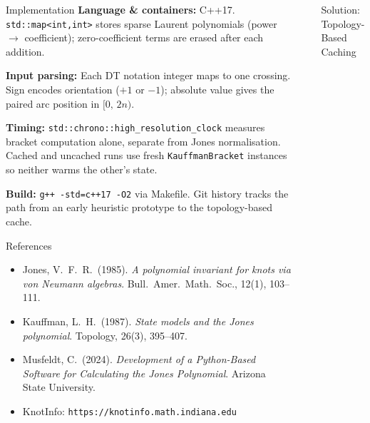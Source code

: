 \documentclass[final]{beamer}
\newlength{\sepwidth}
\newlength{\colwidth}
\newcommand{\separatorcolumn}{\begin{column}{\sepwidth}\end{column}}
\begin{document}
\begin{frame}[t,fragile]
\begin{columns}[t]
\begin{column}{\colwidth}
  \begin{block}{Implementation}
    \textbf{Language \& containers:} C++17. \texttt{std::map<int,int>} stores sparse Laurent polynomials (power $\to$ coefficient); zero-coefficient terms are erased after each addition.

    \vspace{0.1cm}
    \textbf{Input parsing:} Each DT notation integer maps to one crossing. Sign encodes orientation ($+1$ or $-1$); absolute value gives the paired arc position in $[0,\,2n)$.

    \vspace{0.1cm}
    \textbf{Timing:} \texttt{std::chrono::high\_resolution\_clock} measures bracket computation alone, separate from Jones normalisation. Cached and uncached runs use fresh \texttt{KauffmanBracket} instances so neither warms the other's state.

    \vspace{0.1cm}
    \textbf{Build:} \texttt{g++ -std=c++17 -O2} via Makefile. Git history tracks the path from an early heuristic prototype to the topology-based cache.
  \end{block}

  \begin{block}{References}
    \footnotesize
    \begin{itemize}\setlength\itemsep{0pt}
      \item Jones, V.\ F.\ R.\ (1985). \textit{A polynomial invariant for knots via von Neumann algebras}. Bull.\ Amer.\ Math.\ Soc., 12(1), 103--111.
      \item Kauffman, L.\ H.\ (1987). \textit{State models and the Jones polynomial}. Topology, 26(3), 395--407.
      \item Musfeldt, C.\ (2024). \textit{Development of a Python-Based Software for Calculating the Jones Polynomial}. Arizona State University.
      \item KnotInfo: \texttt{https://knotinfo.math.indiana.edu}
    \end{itemize}
  \end{block}

\end{column}

\separatorcolumn

\begin{column}{\colwidth}

  \begin{exampleblock}{Solution: Topology-Based Caching}


\end{exampleblock}
\end{column}
\end{columns}
\end{frame}
\end{document}
